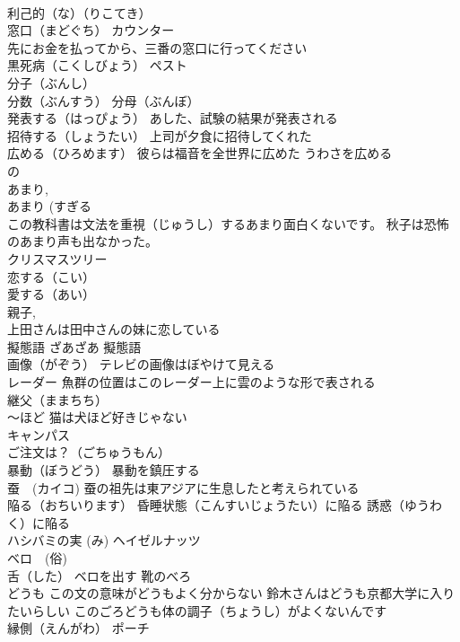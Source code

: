 \documentclass[8pt]{extreport}
\begin{document}
\begin{CJK}{UTF8}{min}
\\	利己的（な）（りこてき）
\\	窓口（まどぐち） カウンター　
\\	先にお金を払ってから、三番の窓口に行ってください
\\	黒死病（こくしびょう） ペスト
\\	分子（ぶんし） 
\\	分数（ぶんすう） 分母（ぶんぼ）
\\	発表する（はっぴょう） あした、試験の結果が発表される
\\	招待する（しょうたい） 上司が夕食に招待してくれた
\\	広める（ひろめます） 彼らは福音を全世界に広めた うわさを広める
\\	の
\\	あまり, 
\\	あまり (すぎる 
\\	この教科書は文法を重視（じゅうし）するあまり面白くないです。 秋子は恐怖のあまり声も出なかった。
\\	クリスマスツリー
\\	恋する（こい） 
\\	愛する（あい） 
\\	親子, 
\\	上田さんは田中さんの妹に恋している
\\	擬態語	ざあざあ 擬態語
\\	画像（がぞう） テレビの画像はぼやけて見える
\\	レーダー 魚群の位置はこのレーダー上に雲のような形で表される
\\	継父（ままちち）
\\	～ほど 猫は犬ほど好きじゃない
\\	キャンパス
\\	ご注文は？（ごちゅうもん）
\\	暴動（ぼうどう） 暴動を鎮圧する
\\	蚕　(カイコ) 蚕の祖先は東アジアに生息したと考えられている
\\	陥る（おちいります） 昏睡状態（こんすいじょうたい）に陥る 誘惑（ゆうわく）に陥る
\\	ハシバミの実 (み) ヘイゼルナッツ
\\	ベロ　(俗) 
\\	舌（した） ベロを出す 靴のべろ
\\	どうも この文の意味がどうもよく分からない 鈴木さんはどうも京都大学に入りたいらしい このごろどうも体の調子（ちょうし）がよくないんです
\\	縁側（えんがわ） ポーチ 

\end{CJK}
\end{document}
